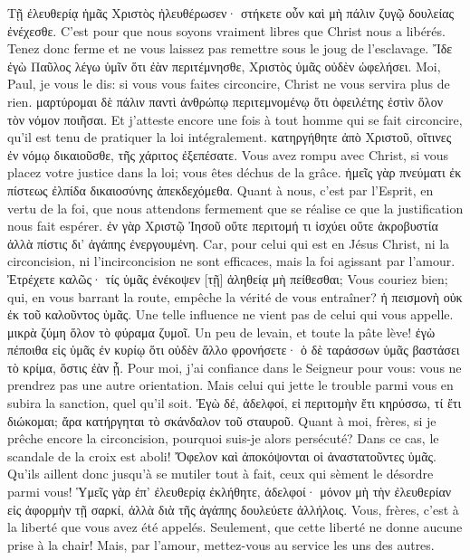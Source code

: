 \documentclass[14pt,a4paper,twoside]{extarticle}
\begin{document}
\begin{paracol}[1]
  \verset
  {Τῇ ἐλευθερίᾳ ἡμᾶς Χριστὸς ἠλευθέρωσεν· στήκετε οὖν καὶ μὴ πάλιν ζυγῷ δουλείας ἐνέχεσθε.}
  {C’est pour que nous soyons vraiment libres que Christ nous a libérés. Tenez donc ferme et ne vous laissez pas remettre sous le joug de l’esclavage.}
  \verset
  {Ἴδε ἐγὼ Παῦλος λέγω ὑμῖν ὅτι ἐὰν περιτέμνησθε, Χριστὸς ὑμᾶς οὐδὲν ὠφελήσει.}
  {Moi, Paul, je vous le dis: si vous vous faites circoncire, Christ ne vous servira plus de rien.}
  \verset
  {μαρτύρομαι δὲ πάλιν παντὶ ἀνθρώπῳ περιτεμνομένῳ ὅτι ὀφειλέτης ἐστὶν ὅλον τὸν νόμον ποιῆσαι.}
  {Et j’atteste encore une fois à tout homme qui se fait circoncire, qu’il est tenu de pratiquer la loi intégralement.}
  \verset
  {κατηργήθητε ἀπὸ Χριστοῦ, οἵτινες ἐν νόμῳ δικαιοῦσθε, τῆς χάριτος ἐξεπέσατε.}
  {Vous avez rompu avec Christ, si vous placez votre justice dans la loi; vous êtes déchus de la grâce.}
  \verset
  {ἡμεῖς γὰρ πνεύματι ἐκ πίστεως ἐλπίδα δικαιοσύνης ἀπεκδεχόμεθα.}
  {Quant à nous, c’est par l’Esprit, en vertu de la foi, que nous attendons fermement que se réalise ce que la justification nous fait espérer.}
  \verset
  {ἐν γὰρ Χριστῷ Ἰησοῦ οὔτε περιτομή τι ἰσχύει οὔτε ἀκροβυστία ἀλλὰ πίστις δι’ ἀγάπης ἐνεργουμένη.}
  {Car, pour celui qui est en Jésus Christ, ni la circoncision, ni l’incirconcision ne sont efficaces, mais la foi agissant par l’amour.}
  \verset
  {Ἐτρέχετε καλῶς· τίς ὑμᾶς ἐνέκοψεν [τῇ] ἀληθείᾳ μὴ πείθεσθαι;}
  {Vous couriez bien; qui, en vous barrant la route, empêche la vérité de vous entraîner?}
  \verset
  {ἡ πεισμονὴ οὐκ ἐκ τοῦ καλοῦντος ὑμᾶς.}
  {Une telle influence ne vient pas de celui qui vous appelle.}
  \verset
  {μικρὰ ζύμη ὅλον τὸ φύραμα ζυμοῖ.}
  {Un peu de levain, et toute la pâte lève!}
  \verset
  {ἐγὼ πέποιθα εἰς ὑμᾶς ἐν κυρίῳ ὅτι οὐδὲν ἄλλο φρονήσετε· ὁ δὲ ταράσσων ὑμᾶς βαστάσει τὸ κρίμα, ὅστις ἐὰν ᾖ.}
  {Pour moi, j’ai confiance dans le Seigneur pour vous: vous ne prendrez pas une autre orientation. Mais celui qui jette le trouble parmi vous en subira la sanction, quel qu’il soit.}
  \verset
  {Ἐγὼ δέ, ἀδελφοί, εἰ περιτομὴν ἔτι κηρύσσω, τί ἔτι διώκομαι; ἄρα κατήργηται τὸ σκάνδαλον τοῦ σταυροῦ.}
  {Quant à moi, frères, si je prêche encore la circoncision, pourquoi suis-je alors persécuté? Dans ce cas, le scandale de la croix est aboli!}
  \verset
  {Ὄφελον καὶ ἀποκόψονται οἱ ἀναστατοῦντες ὑμᾶς.}
  {Qu’ils aillent donc jusqu’à se mutiler tout à fait, ceux qui sèment le désordre parmi vous!}
  \verset
  {Ὑμεῖς γὰρ ἐπ’ ἐλευθερίᾳ ἐκλήθητε, ἀδελφοί· μόνον μὴ τὴν ἐλευθερίαν εἰς ἀφορμὴν τῇ σαρκί, ἀλλὰ διὰ τῆς ἀγάπης δουλεύετε ἀλλήλοις.}
  {Vous, frères, c’est à la liberté que vous avez été appelés. Seulement, que cette liberté ne donne aucune prise à la chair! Mais, par l’amour, mettez-vous au service les uns des autres.}

\end{paracol}
\end{document}
